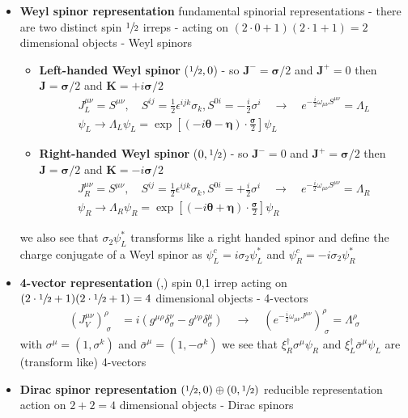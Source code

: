 \documentclass[10pt,a4paper]{report}
\theoremstyle{definition}
\begin{document}
\begin{itemize}
\begin{itemize}
\begin{itemize}
\item {\bf Weyl spinor representation} fundamental spinorial representations - there are two distinct spin $\sfrac{1}{2}$ irreps - acting on $(2\cdot0+1)(2\cdot1+1)=2$ dimensional objects - Weyl spinors
\begin{itemize}
\item {\bf Left-handed Weyl spinor} ($\sfrac{1}{2},0$) - so $\mathbf{J}^-=\pmb{\sigma}/2$ and $\mathbf{J}^+=0$ then $\mathbf{J}=\pmb{\sigma}/2$ and $\mathbf{K}=+i\pmb{\sigma}/2$
\begin{align}
J_L^{\mu\nu}=S^{\mu\nu},\quad 
S^{ij}=\frac{1}{2}\epsilon^{ijk}\sigma_k, 
S^{0i}=-\frac{i}{2}\sigma^i
\quad\rightarrow\quad e^{-\frac{i}{2}\omega_{\mu\nu}S^{\mu\nu}}=\Lambda_L\\
\psi_L\rightarrow\Lambda_L\psi_L=\exp\left[(-i\pmb{\theta}-\pmb{\eta})\cdot\frac{\pmb{\sigma}}{2}\right]\psi_L
\end{align}
\item {\bf Right-handed Weyl spinor} ($0,\sfrac{1}{2}$) - so $\mathbf{J}^-=0$ and $\mathbf{J}^+=\pmb{\sigma}/2$ then $\mathbf{J}=\pmb{\sigma}/2$ and $\mathbf{K}=-i\pmb{\sigma}/2$
\begin{align}
J_R^{\mu\nu}=S^{\mu\nu},\quad 
S^{ij}=\frac{1}{2}\epsilon^{ijk}\sigma_k, 
S^{0i}=+\frac{i}{2}\sigma^i
\quad\rightarrow\quad e^{-\frac{i}{2}\omega_{\mu\nu}S^{\mu\nu}}=\Lambda_R\\
\psi_R\rightarrow\Lambda_R\psi_R=\exp\left[(-i\pmb{\theta}+\pmb{\eta})\cdot\frac{\pmb{\sigma}}{2}\right]\psi_R
\end{align}
\end{itemize}
we also see that $\sigma_2\psi_L^*$ transforms like a right handed spinor and define the charge conjugate of a Weyl spinor as  $\psi_L^c=i\sigma_2\psi_L^*$ and $\psi_R^c=-i\sigma_2\psi_R^*$
\item {\bf 4-vector representation} (,) spin 0,1 irrep acting on $(2\cdot\sfrac{1}{2}+1)(2\cdot\sfrac{1}{2}+1)=4$ dimensional objects - 4-vectors
\begin{align}
(J_V^{\mu\nu})^\rho_{\;\sigma}
&=i(g^{\mu\rho}\delta^\nu_\sigma-g^{\nu\rho}\delta^\mu_\sigma)\quad\rightarrow\quad (e^{-\frac{i}{2}\omega_{\mu\nu}J^{\mu\nu}})^\rho_{\;\sigma}=\Lambda^\rho_{\;\sigma}
\end{align}
with $\sigma^\mu=(1,\sigma^k)$ and $\bar{\sigma}^\mu=(1,-\sigma^k)$ we see that $\xi_R^\dagger\sigma^\mu\psi_R$ and $\xi_L^\dagger\bar{\sigma}^\mu\psi_L$ are (transform like) 4-vectors
\item {\bf Dirac spinor representation} $(\sfrac{1}{2},0)\oplus(0,\sfrac{1}{2})$ reducible representation action on $2+2=4$ dimensional objects - Dirac spinors

\end{itemize}
\end{itemize}
\end{itemize}
\end{document}
